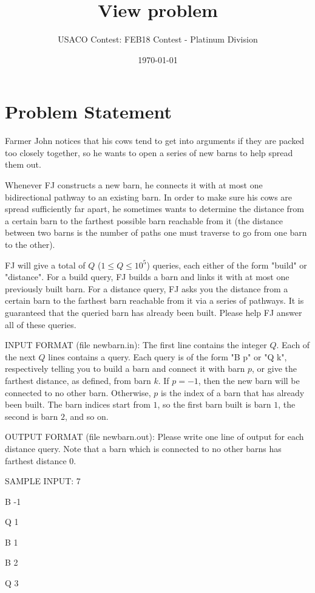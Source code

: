 \documentclass[12pt]{article}
\title{View problem}
\author{USACO Contest: FEB18 Contest - Platinum Division}
\date{\today}
\begin{document}
\maketitle

\section*{Problem Statement}

Farmer John notices that his cows tend to get into arguments if they are packed
too closely together, so he wants to open a series of new barns to help spread
them out.

Whenever FJ constructs a new barn, he connects it with at most one bidirectional
pathway to  an existing barn.  In order to make sure his cows are spread
sufficiently far apart, he sometimes wants to determine the distance from a
certain barn to the farthest possible barn reachable from it (the distance
between two barns is the number of paths one must traverse to go from one barn
to the other).

FJ will give a total of $Q$ ($1 \leq Q \leq 10^5$) queries, each either of the
form "build" or "distance". For a build query, FJ builds a barn and links it
with at most one previously built barn. For a distance query, FJ asks you the
distance from a certain barn to the farthest barn reachable from it via a series
of pathways.  It is guaranteed that the queried barn has already been built.
Please help FJ answer all of these queries.

INPUT FORMAT (file newbarn.in):
The first line contains the integer $Q$. Each of the next $Q$ lines contains a
query. Each query is of the form "B p" or "Q k", respectively telling you to
build a barn and connect it with barn $p$, or give the farthest distance, as
defined, from barn $k$. If $p = -1$, then the new barn will be connected to no
other barn. Otherwise, $p$ is the index of a barn that has already been built.
The barn indices start from $1$, so the first barn built is barn $1$, the second
is barn $2$, and so on.

OUTPUT FORMAT (file newbarn.out):
Please write one line of output for each distance query.  Note that a barn
which is connected to no other barns has farthest distance $0$.

SAMPLE INPUT:
7

B -1

Q 1

B 1

B 2

Q 3
\end{document}

